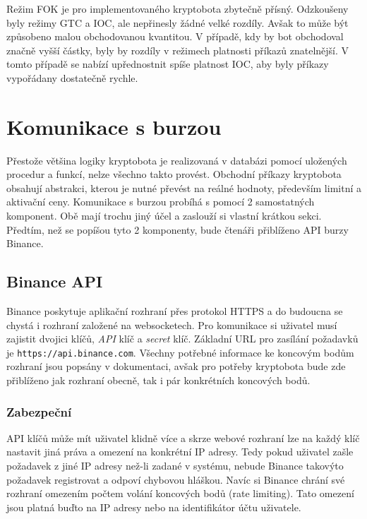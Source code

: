 Režim FOK je pro implementovaného kryptobota zbytečně přísný. Odzkoušeny byly režimy GTC a IOC, ale nepřinesly žádné velké rozdíly. Avšak to může být způsobeno malou obchodovanou kvantitou.
V případě, kdy by bot obchodoval značně vyšší částky, byly by rozdíly v režimech platnosti příkazů znatelnější. V tomto případě se nabízí upřednostnit spíše platnost IOC, aby byly příkazy
vypořádany dostatečně rychle. 

\section{Komunikace s burzou}
\label{subsec:exchanges-comm}
Přestože většina logiky kryptobota je realizovaná v databázi pomocí uložených procedur a funkcí, nelze všechno takto provést. Obchodní příkazy kryptobota obsahují abstrakci, kterou je
nutné převést na reálné hodnoty, především limitní a aktivační ceny. Komunikace s burzou probíhá s pomocí 2 samostatných komponent. Obě mají trochu jiný účel a zaslouží si vlastní krátkou sekci.
Předtím, než se popíšou tyto 2 komponenty, bude čtenáři přiblíženo API burzy Binance.

\subsection{Binance API}
Binance poskytuje aplikační rozhraní přes protokol HTTPS a do budoucna se chystá i rozhraní založené na websocketech.
Pro komunikace si uživatel musí zajistit dvojici klíčů, \emph{API} klíč 
a \emph{secret} klíč.
Základní URL pro zasílání požadavků je \verb|https://api.binance.com|.
Všechny potřebné informace ke koncovým bodům rozhraní jsou popsány v dokumentaci, avšak pro potřeby kryptobota bude zde přiblíženo jak rozhraní obecně, tak i pár konkrétních koncových bodů.

\subsubsection{Zabezpeční}
API klíčů může mít uživatel klidně více a skrze webové rozhraní lze na každý klíč nastavit jiná práva a omezení na konkrétní IP adresy. Tedy pokud uživatel zašle požadavek z jiné IP adresy než-li
zadané v systému, nebude Binance takovýto požadavek registrovat a odpoví chybovou hláškou. Navíc si Binance chrání své rozhraní omezením počtem volání koncových bodů (rate limiting). Tato omezení
jsou platná buďto na IP adresy nebo na identifikátor účtu uživatele.

